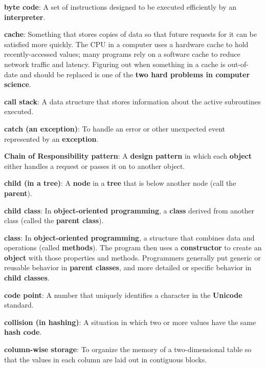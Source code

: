 \documentclass{scrbook}
\newcommand{\glosskey}[1]{\textbf{#1}}
\begin{document}
\noindent \textbf{\glosskey{byte code}}: 
A set of instructions designed to be executed efficiently by an \glosskey{interpreter}.


\noindent \textbf{\glosskey{cache}}: 
Something that stores copies of data so that future requests for it can be satisfied more quickly. The CPU in a computer uses a hardware cache to hold recently-accessed values; many programs rely on a software cache to reduce network traffic and latency. Figuring out when something in a cache is out-of-date and should be replaced is one of the \glosskey{two hard problems in computer science}.


\noindent \textbf{\glosskey{call stack}}: 
A data structure that stores information about the active subroutines executed.


\noindent \textbf{\glosskey{catch (an exception)}}: 
To handle an error or other unexpected event represented by an \glosskey{exception}.


\noindent \textbf{\glosskey{Chain of Responsibility pattern}}: 
A \glosskey{design pattern} in which each \glosskey{object} either handles a request or passes it on to another object.


\noindent \textbf{\glosskey{child (in a tree)}}: 
A \glosskey{node} in a \glosskey{tree} that is below another node (call the \glosskey{parent}).


\noindent \textbf{\glosskey{child class}}: 
In \glosskey{object-oriented programming}, a \glosskey{class} derived from another class (called the \glosskey{parent class}).


\noindent \textbf{\glosskey{class}}: 
In \glosskey{object-oriented programming}, a structure that combines data and operations (called \glosskey{methods}). The program then uses a \glosskey{constructor} to create an \glosskey{object} with those properties and methods. Programmers generally put generic or reusable behavior in \glosskey{parent classes}, and more detailed or specific behavior in \glosskey{child classes}.


\noindent \textbf{\glosskey{code point}}: 
A number that uniquely identifies a character in the \glosskey{Unicode} standard.


\noindent \textbf{\glosskey{collision (in hashing)}}: 
A situation in which two or more values have the same \glosskey{hash code}.


\noindent \textbf{\glosskey{column-wise storage}}: 
To organize the memory of a two-dimensional table so that the values in each column are laid out in contiguous blocks.
\end{document}
